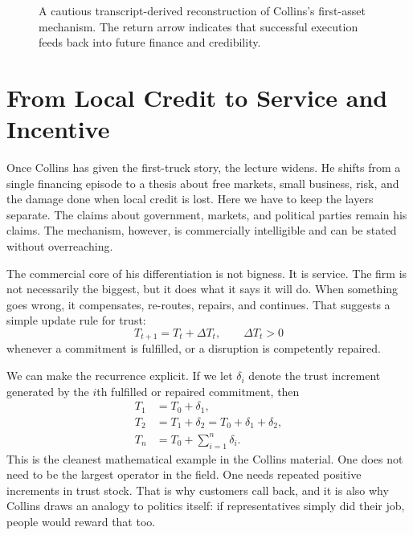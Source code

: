 \begin{figure}[h]
\centering
{}
\caption{A cautious transcript-derived reconstruction of Collins's first-asset mechanism. The return arrow indicates that successful execution feeds back into future finance and credibility.}
\end{figure}

\section{From Local Credit to Service and Incentive}

Once Collins has given the first-truck story, the lecture widens. He shifts from a single financing episode to a thesis about free markets, small business, risk, and the damage done when local credit is lost. Here we have to keep the layers separate. The claims about government, markets, and political parties remain his claims. The mechanism, however, is commercially intelligible and can be stated without overreaching.

The commercial core of his differentiation is not bigness. It is service. The firm is not necessarily the biggest, but it does what it says it will do. When something goes wrong, it compensates, re-routes, repairs, and continues. That suggests a simple update rule for trust:
\begin{equation}
T_{t+1}=T_t+\Delta T_t,\qquad \Delta T_t>0
\end{equation}
whenever a commitment is fulfilled, or a disruption is competently repaired.

We can make the recurrence explicit. If we let $\delta_i$ denote the trust increment generated by the $i$th fulfilled or repaired commitment, then
\begin{align}
T_1 &= T_0+\delta_1,\\
T_2 &= T_1+\delta_2 = T_0+\delta_1+\delta_2,\\
T_n &= T_0+\sum_{i=1}^n \delta_i.
\end{align}
This is the cleanest mathematical example in the Collins material. One does not need to be the largest operator in the field. One needs repeated positive increments in trust stock. That is why customers call back, and it is also why Collins draws an analogy to politics itself: if representatives simply did their job, people would reward that too.


